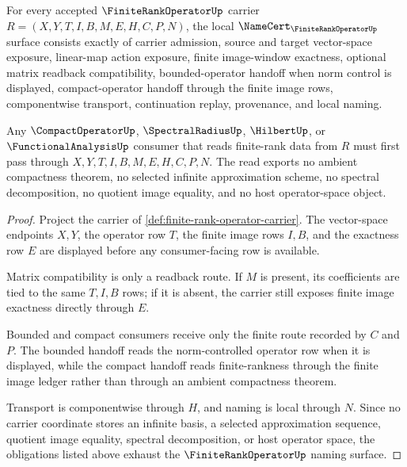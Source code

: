 \begin{theorem}
\label{thm:finite-rank-operator-namecert-obligations}
For every accepted $\FiniteRankOperatorUp$ carrier $R=(X,Y,T,I,B,M,E,H,C,P,N)$, the local $\NameCert_{\FiniteRankOperatorUp}$ surface consists exactly of carrier admission, source and target vector-space exposure, linear-map action exposure, finite image-window exactness, optional matrix readback compatibility, bounded-operator handoff when norm control is displayed, compact-operator handoff through the finite image rows, componentwise transport, continuation replay, provenance, and local naming.

Any $\CompactOperatorUp$, $\SpectralRadiusUp$, $\HilbertUp$, or $\FunctionalAnalysisUp$ consumer that reads finite-rank data from $R$ must first pass through $X,Y,T,I,B,M,E,H,C,P,N$. The read exports no ambient compactness theorem, no selected infinite approximation scheme, no spectral decomposition, no quotient image equality, and no host operator-space object.
\end{theorem}
\begin{proof}
Project the carrier of \autoref{def:finite-rank-operator-carrier}. The vector-space endpoints $X,Y$, the operator row $T$, the finite image rows $I,B$, and the exactness row $E$ are displayed before any consumer-facing row is available.

Matrix compatibility is only a readback route. If $M$ is present, its coefficients are tied to the same $T,I,B$ rows; if it is absent, the carrier still exposes finite image exactness directly through $E$.

Bounded and compact consumers receive only the finite route recorded by $C$ and $P$. The bounded handoff reads the norm-controlled operator row when it is displayed, while the compact handoff reads finite-rankness through the finite image ledger rather than through an ambient compactness theorem.

Transport is componentwise through $H$, and naming is local through $N$. Since no carrier coordinate stores an infinite basis, a selected approximation sequence, quotient image equality, spectral decomposition, or host operator space, the obligations listed above exhaust the $\FiniteRankOperatorUp$ naming surface.
\end{proof}


